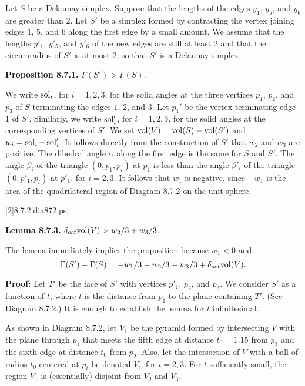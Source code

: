 \bigskip
{}
\bigskip

Let $S$ be a Delaunay simplex.
Suppose
that the lengths of the edges $y_1$, $y_5$, and $y_6$ are greater than
$2$.  Let $S'$ be a simplex formed by contracting the vertex joining
edges $1$, $5$, and $6$ along the first edge by a small amount.  We assume
that the lengths  $y'_1$, $y'_5$, and $y'_6$ of the new edges
are still at
least $2$ and that the circumradius of $S'$ is at most 2, so
that $S'$ is a Delaunay simplex.

\bigskip
{\bf Proposition 8.7.1.}  $\Gamma(S') > \Gamma(S)$.

\bigskip
We write $\operatorname{sol}_i$, for $i=1,2,3$, for the solid angles at the three
vertices $p_1$, $p_2$, and $p_3$ of $S$ terminating
the edges $1$, $2$, and $3$. Let $p_1'$ be the vertex terminating
edge $1$ of $S'$.
Similarly,
we write $\operatorname{sol}'_i$, for $i=1,2,3$, for the solid angles at the
corresponding vertices of $S'$.  We set $\hbox{vol}(V) = \hbox{vol}(S)-\hbox{vol}(S')$ and
$w_i = \operatorname{sol}_i-\operatorname{sol}'_i$.  It follows directly from the
construction of $S'$ that $w_2$ and $w_3$ are positive.
The dihedral angle $\alpha$ along the first edge is the same for
$S$ and $S'$. The angle $\beta_i$ of the triangle $(0,p_1,p_i)$ 
at $p_1$ is less than the angle $\beta'_i$ of the triangle
$(0,p'_1,p_i)$ at $p'_1$, for $i=2,3$.  It follows that $w_1$
is negative, since $-w_1$ is the area of the quadrilateral
region of Diagram 8.7.2 on the unit sphere.

\gram|2|8.7.2|dia872.ps|

\bigskip
{\bf Lemma 8.7.3.}  $\delta_{oct} \hbox{vol}(V) > w_2/3 + w_3/3 $.

\bigskip
The lemma immediately implies the proposition because $w_1<0$
and
$$\Gamma(S') -\Gamma(S) = -w_1/3 -w_2/3 -w_3/3 + \delta_{oct}\hbox{vol}(V).$$

\bigskip
{\bf Proof:}  
Let $T'$ be the face of $S'$ with
vertices $p'_1$, $p_2$, and $p_3$.
We consider $S'$ as a function of $t$, where $t$ is the
distance from $p_1$ to the plane containing $T'$.
(See Diagram 8.7.2.)  
It is enough to establish the lemma
for $t$ infinitesimal.

As shown in Diagram 8.7.2,  let $V_1$ be the pyramid formed
by intersecting $V$ with the plane through $p_1$ that meets
the fifth edge at distance $t_0=1.15$ from $p_3$ and the sixth
edge at distance $t_0$ from $p_2$.
Also, let the intersection of $V$ with
a ball of radius $t_0$ centered at $p_i$ be denoted $V_i$, for
$i=2,3$.  For $t$ sufficiently small, the region $V_1$ is (essentially)
disjoint from $V_2$ and $V_3$.

